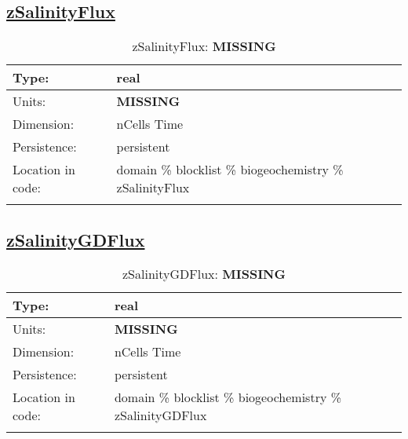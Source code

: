 \subsection[zSalinityFlux]{\hyperref[sec:var_tab_biogeochemistry]{zSalinityFlux}}
\label{subsec:var_sec_biogeochemistry_zSalinityFlux}
\begin{center}
\begin{longtable}{| p{2.0in} | p{4.0in} |}
        \hline 
        Type: & real \\
        \hline 
        Units: & {\bf \color{red} MISSING} \\
        \hline 
        Dimension: & nCells Time \\
        \hline 
        Persistence: & persistent \\
        \hline 
         Location in code: & domain \% blocklist \% biogeochemistry \% zSalinityFlux \\
         \hline 
    \caption{zSalinityFlux: {\bf \color{red} MISSING}}
\end{longtable}
\end{center}
\subsection[zSalinityGDFlux]{\hyperref[sec:var_tab_biogeochemistry]{zSalinityGDFlux}}
\label{subsec:var_sec_biogeochemistry_zSalinityGDFlux}
\begin{center}
\begin{longtable}{| p{2.0in} | p{4.0in} |}
        \hline 
        Type: & real \\
        \hline 
        Units: & {\bf \color{red} MISSING} \\
        \hline 
        Dimension: & nCells Time \\
        \hline 
        Persistence: & persistent \\
        \hline 
         Location in code: & domain \% blocklist \% biogeochemistry \% zSalinityGDFlux \\
         \hline 
    \caption{zSalinityGDFlux: {\bf \color{red} MISSING}}
\end{longtable}
\end{center}
